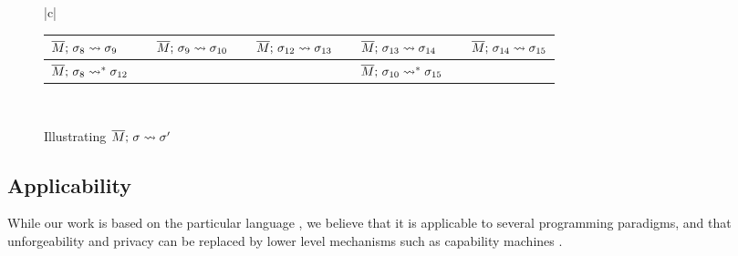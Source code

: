 \begin{figure}[htb]
\begin{tabular}{|c|}
 \hline %
 \\
\hline
\begin{tabular}{lclclclcl}
$\overline{M};\, \sigma_8 \leadsto {\sigma_9} $  & & 
$\overline{M};\, \sigma_9 \leadsto {\sigma_{10}} $ &  &
$\overline{M};\, \sigma_{12} \leadsto {\sigma_{13}} $ & & 
$\overline{M};\, \sigma_{13} \leadsto {\sigma_{14}} $  &  &
$\overline{M};\, \sigma_{14} \leadsto {\sigma_{15}} $
\\
\hline
$\overline{M};\, \sigma_8 \leadsto^* {\sigma_{12}}$ & & \ & & \ & & $\overline{M};\, \sigma_{10} \leadsto^* {\sigma_{15}}$
\\
\hline
\end{tabular}
\\
\hline
\end{tabular}
   \caption{Illustrating   $\overline{M};\, \sigma \leadsto {\sigma'}$
    }
   \label{fig:UpSemantics}
 \end{figure}
 
 
 

\subsection*{Applicability} 
While our work is based on the particular language  \LangOO , %
we believe that it is applicable to several programming paradigms, and  that   unforgeability and privacy
 can be replaced  by lower level mechanisms such as capability machines \cite{vanproving,davis2019cheriabi}.


